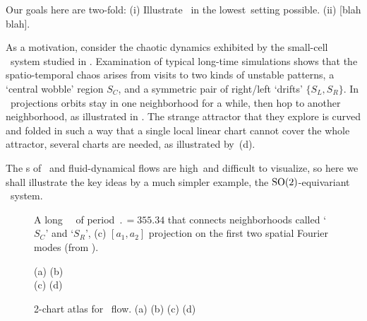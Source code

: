 \documentclass[aip,cha,
reprint,
secnumarabic,
nofootinbib, tightenlines,
nobibnotes, showkeys, showpacs,
groupedaddress,
]{revtex4-1}
\begin{document}
Our goals here are two-fold:
(i)  Illustrate \mslices\ in the lowest\dmn\ setting possible.
(ii) [blah blah].

As a motivation, consider the chaotic dynamics exhibited by the
small-cell \KS\ system studied in . Examination of
typical long-time simulations shows that the spatio-temporal chaos arises
from visits to two kinds of unstable patterns, a `central wobble' region
$S_C$, and a symmetric pair of right/left `drifts' $\{S_L,S_R\}$. In
\statesp\ projections orbits stay in one neighborhood for a while, then
hop to another neighborhood, as illustrated in . The
strange attractor that they explore is curved and folded in such a way
that a single local linear chart cannot cover the whole attractor,
several charts are needed, as illustrated by \,(d).

The \statesp s of \KS\ and fluid-dynamical flows are high\dmn\ and
difficult to visualize, so here we shall illustrate the key ideas by a
much simpler example, the $\textrm{SO}(2)$-equivariant  \twoMode\ system.

\begin{figure} %
    \centering
\caption[]{
A long \KS\ \po\ of period $\period{}=355.34$ that connects
neighborhoods called `$S_C$' and `$S_R$',
(c) $[a_1,a_2]$  projection on the first two spatial Fourier modes
(from ).
      }
\label{f:antlong}
\end{figure}

\begin{figure}
 \begin{center}
 \setlength{\unitlength}{0.20\textwidth}
(a)
(b)
\\
(c)
(d)
 \end{center}
    \caption{
2-chart atlas for \twoMode\ flow.
(a)
(b)
(c)
(d)
    }
\label{fig:2modeSects}
\end{figure}
\end{document}
